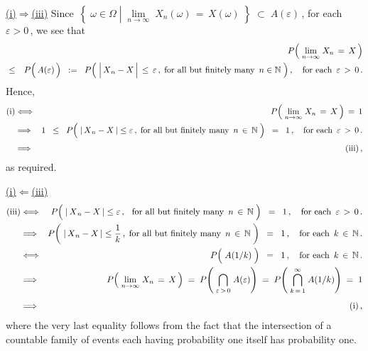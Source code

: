 \vskip 0.5cm
\noindent
\underline{(i)\;$\Longrightarrow$\;(iii)}
\vskip 0.3cm
\noindent
Since
\,$\!\left\{\;
	\omega \in \Omega
	\;\left\vert\;
	\underset{n\rightarrow\infty}{\lim}\;X_{n}(\omega) \,=\, X(\omega)
	\right.
	\;\right\}
\; \subset \; A(\varepsilon)$\,,
for each \,$\varepsilon > 0$\,,
we see that
\begin{eqnarray*}
&&
	P\!\left(\;\underset{n\rightarrow\infty}{\lim}\;X_{n} \,=\, X\,\right)
\\
& \leq &
	P\!\left(\,\overset{{\color{white}.}}A(\varepsilon)\,\right)
	\;\; := \;\;
		P\!\left(\;
			\left\vert\,\overset{{\color{white}.}}{X}_{n} - X\,\right\vert \,\leq\, \varepsilon\,,\;
			\textnormal{for all but finitely many \,$n \in \N$}
			\;\right),
	\quad\textnormal{for each \,$\varepsilon \,>\, 0$}\,.
\end{eqnarray*}
Hence,
\begin{eqnarray*}
\textnormal{(i)}
& \Longleftrightarrow  &
	P\!\left(\;\underset{n\rightarrow\infty}{\lim}\;X_{n} \,=\, X\,\right) \, = \, 1
\\
& \Longrightarrow &
	1
	\;\; \leq \;\;
		P\!\left(\;
			\vert\,\overset{{\color{white}.}}{X}_{n} - X\,\vert \leq \varepsilon\,,
			\;\textnormal{for all but finitely many \,$n \,\in\, \N$}
			\;\right)
	\;\; = \;\;
		1\,,
	\quad\textnormal{for each \,$\varepsilon \,>\, 0$}\,.
\\
& \Longrightarrow &
	\overset{{\color{white}.}}{\textnormal{(iii)}}\,,
\end{eqnarray*}
as required.

\vskip 0.8cm
\noindent
\underline{(i)\;$\Longleftarrow$\;(iii)}
\vskip 0.3cm
\noindent
\begin{eqnarray*}
\textnormal{(iii)}
& \Longleftrightarrow  &
	P\!\left(\;
		\vert\,\overset{{\color{white}.}}{X}_{n} - X\,\vert \leq \varepsilon\,,
		\,\;\;\textnormal{for all but finitely many \,$n \,\in\, \N$}
		\;\right)
	\;\; = \;\; 1\,,
	\quad\textnormal{for each \,$\varepsilon \,>\, 0$}\,.
\\
& \Longrightarrow  &
	P\!\left(\;
		\vert\,\overset{{\color{white}.}}{X}_{n} - X\,\vert \leq \dfrac{1}{k}\,,
		\;\textnormal{for all but finitely many \,$n \,\in\, \N$}
		\;\right)
	\;\; = \;\; 1\,,
	\quad\textnormal{for each \,$k \,\in\, \N$}\,.
\\
& \overset{{\color{white}-}}{\Longleftrightarrow}  &
	P\!\left(\; \overset{{\color{white}.}}{A}(1/k) \;\right)
	\;\; = \;\; 1\,,
	\quad\textnormal{for each \,$k \,\in\, \N$}\,.
\\
& \overset{{\color{white}\vert}}{\Longrightarrow}  &
	P\!\left(\;\underset{n\rightarrow\infty}{\lim}\;X_{n} \,=\, X\,\right)
	\; = \;
	P\!\left(\; \underset{\varepsilon\,>\,0}{\bigcap}\; A(\varepsilon) \right)
	\; = \;
	P\!\left(\; \overset{\infty}{\underset{k\,=\,1}{\bigcap}}\; A(1/k) \right)
	\; = \;
		1
\\
& \overset{{\color{white}\vert}}{\Longrightarrow}  &
	\textnormal{(i)}\,,
\end{eqnarray*}
where the very last equality follows from the fact that the intersection of
a countable family of events each having probability one itself has probability one.

